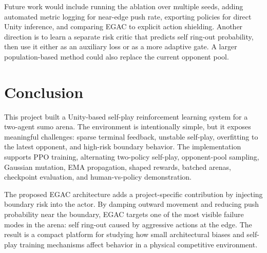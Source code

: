 \documentclass{article}
\begin{document}
Future work would include running the ablation over multiple seeds, adding automated metric logging for near-edge push rate, exporting policies for direct Unity inference, and comparing EGAC to explicit action shielding. Another direction is to learn a separate risk critic that predicts self ring-out probability, then use it either as an auxiliary loss or as a more adaptive gate. A larger population-based method could also replace the current opponent pool.

\section{Conclusion}

This project built a Unity-based self-play reinforcement learning system for a two-agent sumo arena. The environment is intentionally simple, but it exposes meaningful challenges: sparse terminal feedback, unstable self-play, overfitting to the latest opponent, and high-risk boundary behavior. The implementation supports PPO training, alternating two-policy self-play, opponent-pool sampling, Gaussian mutation, EMA propagation, shaped rewards, batched arenas, checkpoint evaluation, and human-vs-policy demonstration.

The proposed EGAC architecture adds a project-specific contribution by injecting boundary risk into the actor. By damping outward movement and reducing push probability near the boundary, EGAC targets one of the most visible failure modes in the arena: self ring-out caused by aggressive actions at the edge. The result is a compact platform for studying how small architectural biases and self-play training mechanisms affect behavior in a physical competitive environment.



\end{document}
